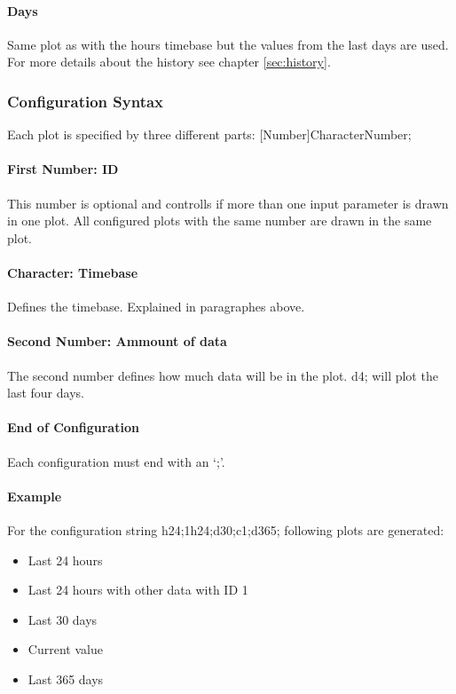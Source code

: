 \paragraph{Days} %
\label{par:days}
Same plot as with the hours timebase but the values from the last days are used. For more details about the history see chapter \ref{sec:history}.

\subsubsection{Configuration Syntax} %
\label{ssub:configuration_syntax}
Each plot is specified by three different parts: [Number]CharacterNumber;

\paragraph{First Number: ID} %
\label{par:first_number_id}
This number is optional and controlls if more than one input parameter is drawn in one plot. All configured plots with the same number are drawn in the same plot.
\paragraph{Character: Timebase} %
\label{par:character}
Defines the timebase. Explained in paragraphes above.
\paragraph{Second Number: Ammount of data} %
\label{par:number}
The second number defines how much data will be in the plot. d4; will plot the last four days.
\paragraph{End of Configuration} %
\label{par:end_of_configuration}
Each configuration must end with an {\C `;'}.

\paragraph{Example} %
\label{par:example}
For the configuration string {\C h24;1h24;d30;c1;d365;} following plots are generated:
\begin{itemize}
	\item Last 24 hours
	\item Last 24 hours with other data with ID 1 
	\item Last 30 days
	\item Current value
	\item Last 365 days
\end{itemize}

